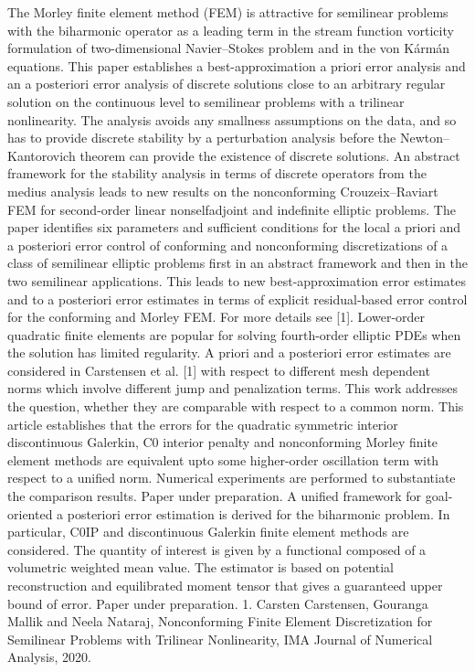 The Morley finite element method (FEM) is attractive for semilinear problems with the biharmonic operator as a leading term in the stream function vorticity formulation of two-dimensional Navier–Stokes problem and in the von Kármán equations. This paper establishes a best-approximation a priori error analysis and an a posteriori error analysis of discrete solutions close to an arbitrary regular solution on the continuous level to semilinear problems with a trilinear nonlinearity. The analysis avoids any smallness assumptions on the data, and so has to provide discrete stability by a perturbation analysis before the Newton–Kantorovich theorem can provide the existence of discrete solutions. An abstract framework for the stability analysis in terms of discrete operators from the medius analysis leads to new results on the nonconforming Crouzeix–Raviart FEM for second-order linear nonselfadjoint and indefinite elliptic problems. The paper identifies six parameters and sufficient conditions for the local a priori and a posteriori error control of conforming and nonconforming discretizations of a class of semilinear elliptic problems first in an abstract framework and then in the two semilinear applications. This leads to new best-approximation error estimates and to a posteriori error estimates in terms of explicit residual-based error control for the conforming and Morley FEM. For more details see [1].  Lower-order quadratic finite elements are popular for solving fourth-order elliptic PDEs when the solution has limited regularity.  A priori and a posteriori error estimates are considered in Carstensen et al. [1] with respect to different mesh dependent norms which involve different jump and penalization terms. This work addresses the question, whether they are comparable with respect to a common norm. This article  establishes that the errors for the quadratic symmetric interior discontinuous Galerkin, C0 interior penalty and nonconforming Morley finite element methods are equivalent upto some higher-order oscillation term with respect to a unified norm. Numerical experiments are performed to substantiate the comparison results. Paper under preparation.  A unified framework for goal-oriented a posteriori error estimation is derived for the biharmonic problem. In particular, C0IP and discontinuous Galerkin finite element methods are considered. The quantity of interest is given by a functional composed of a volumetric weighted mean value. The estimator is based on potential reconstruction and equilibrated moment tensor that gives a  guaranteed upper bound of error. Paper under preparation.  1. Carsten Carstensen, Gouranga Mallik and Neela Nataraj, Nonconforming Finite Element Discretization for Semilinear Problems with Trilinear Nonlinearity, IMA Journal of Numerical Analysis, 2020.  


